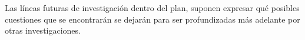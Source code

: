 Las líneas futuras de investigación dentro del plan, suponen expresar qué posibles cuestiones que se encontrarán se dejarán para ser profundizadas más adelante por otras investigaciones.